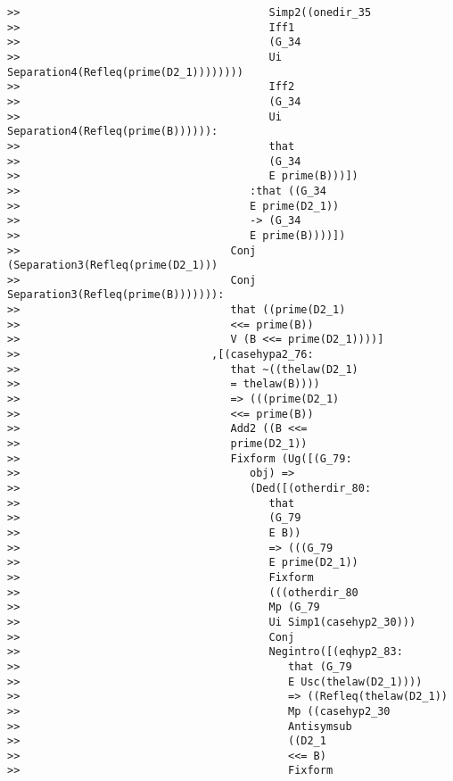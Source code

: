 \documentclass[12pt]{article}
\begin{document}
\begin{verbatim}
>>                                       Simp2((onedir_35
>>                                       Iff1
>>                                       (G_34
>>                                       Ui Separation4(Refleq(prime(D2_1))))))))
>>                                       Iff2
>>                                       (G_34
>>                                       Ui Separation4(Refleq(prime(B)))))):
>>                                       that
>>                                       (G_34
>>                                       E prime(B)))])
>>                                    :that ((G_34
>>                                    E prime(D2_1))
>>                                    -> (G_34
>>                                    E prime(B))))])
>>                                 Conj (Separation3(Refleq(prime(D2_1)))
>>                                 Conj Separation3(Refleq(prime(B))))))):
>>                                 that ((prime(D2_1)
>>                                 <<= prime(B))
>>                                 V (B <<= prime(D2_1))))]
>>                              ,[(casehypa2_76:
>>                                 that ~((thelaw(D2_1)
>>                                 = thelaw(B))))
>>                                 => (((prime(D2_1)
>>                                 <<= prime(B))
>>                                 Add2 ((B <<=
>>                                 prime(D2_1))
>>                                 Fixform (Ug([(G_79:
>>                                    obj) =>
>>                                    (Ded([(otherdir_80:
>>                                       that
>>                                       (G_79
>>                                       E B))
>>                                       => (((G_79
>>                                       E prime(D2_1))
>>                                       Fixform
>>                                       (((otherdir_80
>>                                       Mp (G_79
>>                                       Ui Simp1(casehyp2_30)))
>>                                       Conj
>>                                       Negintro([(eqhyp2_83:
>>                                          that (G_79
>>                                          E Usc(thelaw(D2_1))))
>>                                          => ((Refleq(thelaw(D2_1))
>>                                          Mp ((casehyp2_30
>>                                          Antisymsub
>>                                          ((D2_1
>>                                          <<= B)
>>                                          Fixform

\end{verbatim}
\end{document}
